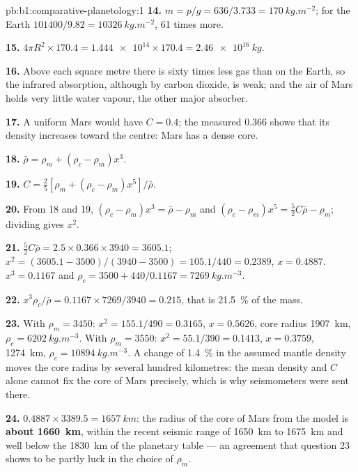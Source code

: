 \begin{solution}{pb:b1:comparative-planetology:1}
\textbf{14.} $m = p/g = 636/3.733 = \qty{170}{kg.m^{-2}}$; for the Earth
$101400/9.82 = \qty{10326}{kg.m^{-2}}$, 61 times more.

\textbf{15.} $4\pi R^2\times170.4 = \num{1.444e14}\times170.4 =
\qty{2.46e16}{kg}$.

\textbf{16.} Above each square metre there is sixty times less gas than on
the Earth, so the infrared absorption, although by carbon dioxide, is weak;
and the air of Mars holds very little water vapour, the other major
absorber.

\textbf{17.} A uniform Mars would have $C = 0.4$; the measured 0.366 shows
that its density increases toward the centre: Mars has a dense core.

\textbf{18.} $\bar\rho = \rho_m + (\rho_c - \rho_m)x^3$.

\textbf{19.} $C = \tfrac25[\rho_m + (\rho_c - \rho_m)x^5]/\bar\rho$.

\textbf{20.} From 18 and 19, $(\rho_c - \rho_m)x^3 = \bar\rho - \rho_m$ and
$(\rho_c - \rho_m)x^5 = \tfrac52C\bar\rho - \rho_m$; dividing gives $x^2$.

\textbf{21.} $\tfrac52C\bar\rho = 2.5\times0.366\times3940 = 3605.1$;
$x^2 = (3605.1 - 3500)/(3940 - 3500) = 105.1/440 = 0.2389$, $x = 0.4887$.
$x^3 = 0.1167$ and $\rho_c = 3500 + 440/0.1167 = \qty{7269}{kg.m^{-3}}$.

\textbf{22.} $x^3\rho_c/\bar\rho = 0.1167\times7269/3940 = 0.215$, that is
\qty{21.5}{\percent} of the mass.

\textbf{23.} With $\rho_m = 3450$: $x^2 = 155.1/490 = 0.3165$, $x = 0.5626$,
core radius \qty{1907}{km}, $\rho_c = \qty{6202}{kg.m^{-3}}$. With $\rho_m =
3550$: $x^2 = 55.1/390 = 0.1413$, $x = 0.3759$, \qty{1274}{km},
$\rho_c = \qty{10894}{kg.m^{-3}}$. A change of \qty{1.4}{\percent} in the
assumed mantle density moves the core radius by several hundred kilometres:
the mean density and $C$ alone cannot fix the core of Mars precisely, which
is why seismometers were sent there.

\textbf{24.} $0.4887\times3389.5 = \qty{1657}{km}$: the radius of the core
of Mars from the model is \textbf{about \qty[text-series-to-math=true]{1660}{km}}, within the recent
seismic range of \qty{1650}{km} to \qty{1675}{km} and well below the
\qty{1830}{km} of the planetary table --- an agreement that question 23
shows to be partly luck in the choice of $\rho_m$.
\end{solution}
